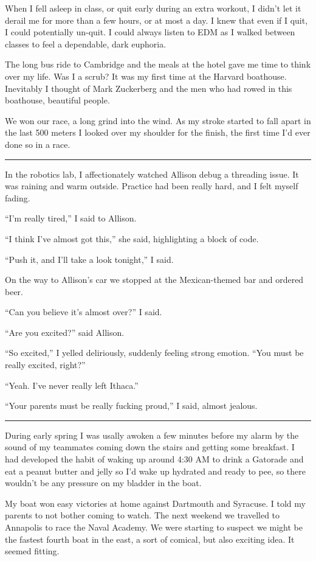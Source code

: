 When I fell asleep in class, or quit early during an extra workout, I didn't let
it derail me for more than a few hours, or at most a day.  I knew that even if I
quit, I could potentially un-quit.  I could always listen to EDM as I walked
between classes to feel a dependable, dark euphoria.
 
The long bus ride to Cambridge and the meals at the hotel gave me time to think
over my life.  Was I a scrub?  It was my first time at the Harvard boathouse.
Inevitably I thought of Mark Zuckerberg and the men who had rowed in this
boathouse, beautiful people. 

We won our race, a long grind into the wind. As my stroke started to fall apart
in the last 500 meters I looked over my shoulder for the finish, the first time
I'd ever done so in a race.

\plainfancybreak{12pt}{2}{* * *}

In the robotics lab, I affectionately watched Allison debug a threading issue.
It was raining and warm outside.  Practice had been really hard, and I felt
myself fading.

``I'm really tired,'' I said to Allison.

``I think I've almost got this,'' she said, highlighting a block of code.

``Push it, and I'll take a look tonight,'' I said.

On the way to Allison's car we stopped at the Mexican-themed bar and ordered
beer.

``Can you believe it's almost over?'' I said.

``Are you excited?'' said Allison.

``So excited,'' I yelled deliriously, suddenly feeling strong emotion.  ``You
must be really excited, right?''

``Yeah.  I've never really left Ithaca.''

``Your parents must be really fucking proud,'' I said, almost jealous.

\plainfancybreak{12pt}{2}{* * *}

During early spring I was usally awoken a few minutes before my alarm by the
sound of my teammates coming down the stairs and getting some breakfast.  I had
developed the habit of waking up around 4:30 AM to drink a Gatorade and eat a
peanut butter and jelly so I'd wake up hydrated and ready to pee, so there
wouldn't be any pressure on my bladder in the boat. 

My boat won easy victories at home against Dartmouth and Syracuse.  I told my
parents to not bother coming to watch.  The next weekend we travelled to
Annapolis to race the Naval Academy.  We were starting to suspect we might be
the fastest fourth boat in the east, a sort of comical, but also exciting idea.
It seemed fitting.  

